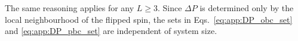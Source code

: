 \documentclass[aps,prb,reprint,twocolumn,amsmath,amssymb,citeautoscript]{revtex4-2}
\begin{document}
The same reasoning applies for any $L\ge 3$. Since $\Delta P$ is determined
only by the local neighbourhood of the flipped spin, the sets
in Eqs.~\eqref{eq:app:DP_obc_set} and \eqref{eq:app:DP_pbc_set} are
independent of system size.

\end{document}
